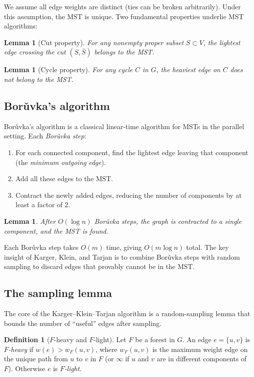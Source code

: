 \documentclass[twoside,12pt]{book}
\theoremstyle{plain}
\newtheorem{lemma}[theorem]{Lemma}
\theoremstyle{definition}
\newtheorem{definition}[theorem]{Definition}
\theoremstyle{remark}
\begin{document}
We assume all edge weights are distinct (ties can be broken arbitrarily). Under this assumption, the MST is unique. Two fundamental properties underlie MST algorithms:

\begin{lemma}[Cut property]
For any nonempty proper subset $S \subset V$, the lightest edge crossing the cut $(S, \bar{S})$ belongs to the MST.
\end{lemma}

\begin{lemma}[Cycle property]
For any cycle $C$ in $G$, the heaviest edge on $C$ does not belong to the MST.
\end{lemma}

\subsection{Bor\v{u}vka's algorithm}

Bor\v{u}vka's algorithm is a classical linear-time algorithm for MSTs in the parallel setting. Each \emph{Bor\v{u}vka step}:
\begin{enumerate}[nosep]
    \item For each connected component, find the lightest edge leaving that component (the \emph{minimum outgoing edge}).
    \item Add all these edges to the MST.
    \item Contract the newly added edges, reducing the number of components by at least a factor of 2.
\end{enumerate}

\begin{lemma}
After $O(\log n)$ Bor\v{u}vka steps, the graph is contracted to a single component, and the MST is found.
\end{lemma}

Each Bor\v{u}vka step takes $O(m)$ time, giving $O(m \log n)$ total. The key insight of Karger, Klein, and Tarjan is to combine Bor\v{u}vka steps with random sampling to discard edges that provably cannot be in the MST.

\subsection{The sampling lemma}

The core of the Karger--Klein--Tarjan algorithm is a random-sampling lemma that bounds the number of ``useful'' edges after sampling.

\begin{definition}[$F$-heavy and $F$-light]
Let $F$ be a forest in $G$. An edge $e = \{u, v\}$ is \emph{$F$-heavy} if $w(e) > w_F(u, v)$, where $w_F(u, v)$ is the maximum weight edge on the unique path from $u$ to $v$ in $F$ (or $\infty$ if $u$ and $v$ are in different components of $F$). Otherwise $e$ is \emph{$F$-light}.
\end{definition}
\end{document}
